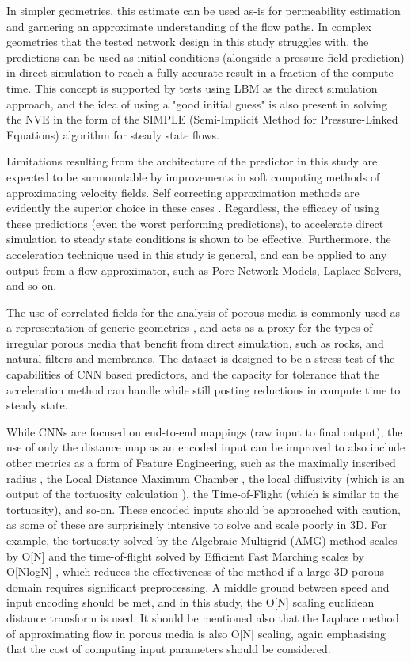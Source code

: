 \documentclass{article}
\begin{document}
In simpler geometries, this estimate can be used as-is for permeability estimation and garnering an approximate understanding of the flow paths. In complex geometries that the tested network design in this study struggles with, the predictions can be used as initial conditions (alongside a pressure field prediction) in direct simulation to reach a fully accurate result in a fraction of the compute time. This concept is supported by tests using LBM as the direct simulation approach, and the idea of using a "good initial guess" is also present in solving the NVE in the form of the SIMPLE (Semi-Implicit Method for Pressure-Linked Equations) algorithm for steady state flows.

Limitations resulting from the architecture of the predictor in this study are expected to be surmountable by improvements in soft computing methods of approximating velocity fields. Self correcting approximation methods are evidently the superior choice in these cases \cite{wang2019multi,hennigh2017lat}. Regardless, the efficacy of using these predictions (even the worst performing predictions), to accelerate direct simulation to steady state conditions is shown to be effective. Furthermore, the acceleration technique used in this study is general, and can be applied to any output from a flow approximator, such as Pore Network Models, Laplace Solvers, and so-on.

The use of correlated fields for the analysis of porous media is commonly used as a representation of generic geometries \cite{LIU2017121}, and acts as a proxy for the types of irregular porous media that benefit from direct simulation, such as rocks, and natural filters and membranes. The dataset is designed to be a stress test of the capabilities of CNN based predictors, and the capacity for tolerance that the acceleration method can handle while still posting reductions in compute time to steady state. 

While CNNs are focused on end-to-end mappings (raw input to final output), the use of only the distance map as an encoded input can be improved to also include other metrics as a form of Feature Engineering, such as the maximally inscribed radius \cite{poreflownet}, the Local Distance Maximum Chamber \cite{wang2019multi}, the local diffusivity (which is an output of the tortuosity calculation \cite{tortuosity}), the Time-of-Flight \cite{tof} (which is similar to the tortuosity), and so-on. These encoded inputs should be approached with caution, as some of these are surprisingly intensive to solve and scale poorly in 3D. For example, the tortuosity solved by the Algebraic Multigrid (AMG) method scales by O[N] \cite{pfvs} and the time-of-flight solved by Efficient Fast Marching scales by O[NlogN] \cite{tof}, which reduces the effectiveness of the method if a large 3D porous domain requires significant preprocessing. A middle ground between speed and input encoding should be met, and in this study, the O[N] scaling euclidean distance transform is used. It should be mentioned also that the Laplace method of approximating flow in porous media is also O[N] scaling, again emphasising that the cost of computing input parameters should be considered. 
\end{document}
